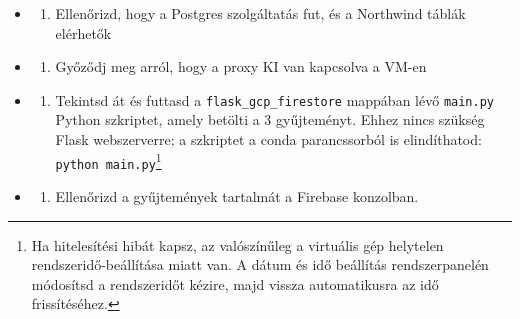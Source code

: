 \documentclass[
  magyar,
]{article}
\providecommand{\tightlist}{%
  \setlength{\itemsep}{0pt}\setlength{\parskip}{0pt}}
\begin{document}
\begin{enumerate}
  \begin{itemize}
  \tightlist
  \item
    \begin{enumerate}
    \def\labelenumii{\alph{enumii}.}
    \tightlist
    \item
      Ellenőrizd, hogy a Postgres szolgáltatás fut, és a Northwind
      táblák elérhetők
    \end{enumerate}
  \item
    \begin{enumerate}
    \def\labelenumii{\alph{enumii}.}
    \setcounter{enumii}{1}
    \tightlist
    \item
      Győződj meg arról, hogy a proxy KI van kapcsolva a VM-en
    \end{enumerate}
  \item
    \begin{enumerate}
    \def\labelenumii{\alph{enumii}.}
    \setcounter{enumii}{2}
    \tightlist
    \item
      Tekintsd át és futtasd a \texttt{flask\_gcp\_firestore} mappában
      lévő \texttt{main.py} Python szkriptet, amely betölti a 3
      gyűjteményt. Ehhez nincs szükség Flask webszerverre; a szkriptet a
      conda parancssorból is elindíthatod:
      \texttt{python\ main.py}\footnote{Ha hitelesítési hibát kapsz, az
        valószínűleg a virtuális gép helytelen rendszeridő-beállítása
        miatt van. A dátum és idő beállítás rendszerpanelén módosítsd a
        rendszeridőt kézire, majd vissza automatikusra az idő
        frissítéséhez.}
    \end{enumerate}
  \item
    \begin{enumerate}
    \def\labelenumii{\alph{enumii}.}
    \setcounter{enumii}{3}
    \tightlist
    \item
      Ellenőrizd a gyűjtemények tartalmát a Firebase konzolban.
    \end{enumerate}
  \end{itemize}
\end{enumerate}
\end{document}
